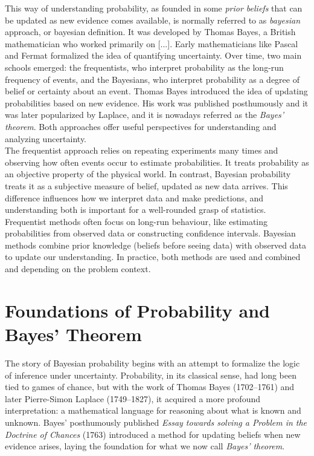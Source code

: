 \documentclass{book}
\begin{document}
This way of understanding probability, as founded in some \textit{prior beliefs} that can be updated as new evidence comes available, is normally referred to as \textit{bayesian} approach, or bayesian definition. It was developed by Thomas Bayes, a British mathematician who worked primarily on [...]. Early mathematicians like Pascal and Fermat formalized the idea of quantifying uncertainty. Over time, two main schools emerged: the frequentists, who interpret probability as the long-run frequency of events, and the Bayesians, who interpret probability as a degree of belief or certainty about an event. Thomas Bayes introduced the idea of updating probabilities based on new evidence. His work was published posthumously and it was later popularized by Laplace, and it is nowadays referred as the \textit{Bayes’ theorem}. Both approaches offer useful perspectives for understanding and analyzing uncertainty.\\

The frequentist approach relies on repeating experiments many times and observing how often events occur to estimate probabilities. It treats probability as an objective property of the physical world. In contrast, Bayesian probability treats it as a subjective measure of belief, updated as new data arrives. This difference influences how we interpret data and make predictions, and understanding both is important for a well-rounded grasp of statistics.\\

Frequentist methods often focus on long-run behaviour, like estimating probabilities from observed data or constructing confidence intervals. Bayesian methods combine prior knowledge (beliefs before seeing data) with observed data to update our understanding. In practice, both methods are used and combined and depending on the problem context.\\

\section{Foundations of Probability and Bayes’ Theorem}

The story of Bayesian probability begins with an attempt to formalize the logic of inference under uncertainty. Probability, in its classical sense, had long been tied to games of chance, but with the work of Thomas Bayes (1702--1761) and later Pierre-Simon Laplace (1749--1827), it acquired a more profound interpretation: a mathematical language for reasoning about what is known and unknown. Bayes’ posthumously published \textit{Essay towards solving a Problem in the Doctrine of Chances} (1763) introduced a method for updating beliefs when new evidence arises, laying the foundation for what we now call \textit{Bayes’ theorem}.
\end{document}
